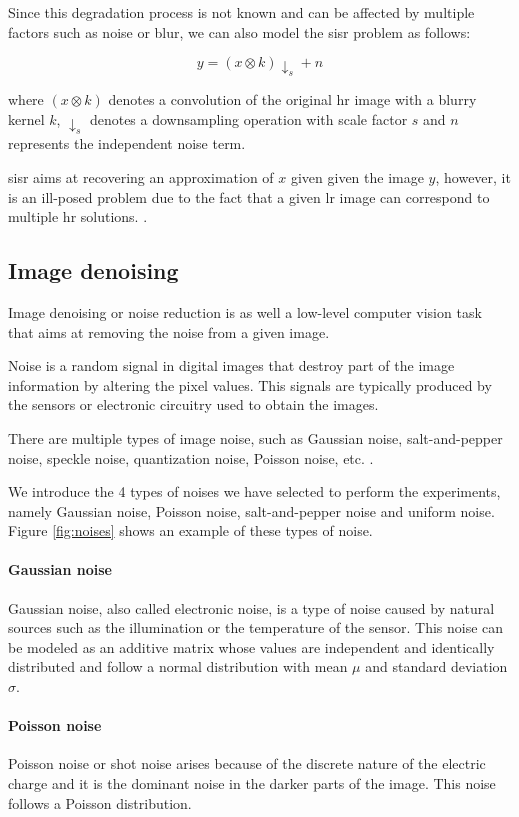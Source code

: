 Since this degradation process is not known and can be affected by multiple factors such as noise or blur, we can also model the \gls{sisr} problem as follows:

$$y = (x\otimes k)\downarrow_s + n$$

where $(x\otimes k)$ denotes a convolution of the original \gls{hr} image with a blurry kernel $k$, $\downarrow_s$ denotes a downsampling operation with scale factor $s$ and $n$ represents the independent noise term.

\gls{sisr} aims at recovering an approximation of $x$ given given the image $y$, however, it is an ill-posed problem due to the fact that a given \gls{lr} image can correspond to multiple \gls{hr} solutions. \cite{DBLP:DEEPSISR}.

\subsection{Image denoising}
Image denoising or noise reduction is as well a low-level computer vision task that aims at removing the noise from a given image. 

Noise is a random signal in digital images that destroy part of the image information by altering the pixel values. This signals are typically produced by the sensors or electronic circuitry used to obtain the images.

There are multiple types of image noise, such as Gaussian noise, salt-and-pepper noise, speckle noise, quantization noise, Poisson noise, etc. \cite{NOISE}.

We introduce the 4 types of noises we have selected to perform the experiments, namely Gaussian noise, Poisson noise, salt-and-pepper noise and uniform noise. Figure \ref{fig:noises} shows an example of these types of noise.

\paragraph{Gaussian noise}
Gaussian noise, also called electronic noise, is a type of noise caused by natural sources such as the illumination or the temperature of the sensor. This noise can be modeled as an additive matrix whose values are independent and identically distributed and follow a normal distribution with mean $\mu$ and standard deviation $\sigma$.

\paragraph{Poisson noise}
Poisson noise or shot noise arises because of the discrete nature of the electric charge and it is the dominant noise in the darker parts of the image. This noise follows a Poisson distribution.

